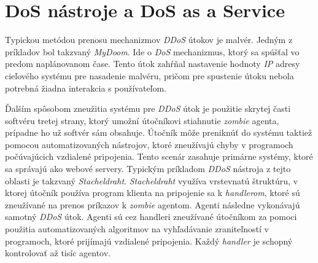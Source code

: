 \documentclass[
  printed, %
  table,   %
  lof,     %
  lot,     %
]{fithesis3}
\begin{document}

\section{DoS nástroje a DoS as a Service}
Typickou metódou prenosu mechanizmov \textit{DDoS} útokov je malvér. Jedným z príkladov bol
takzvaný \textit{MyDoom}. Ide o \textit{DoS} mechanizmus, ktorý sa spúšťal vo predom naplánovanom čase.
Tento útok zahŕňal nastavenie hodnoty \textit{IP} adresy cieľového systému pre nasadenie malvéru,
pričom pre spustenie útoku nebola potrebná žiadna interakcia s používateľom.

Ďalším spôsobom zneužitia systému pre \textit{DDoS} útok je použitie skrytej časti softvéru tretej
strany, ktorý umožní útočníkovi stiahnutie \textit{zombie} agenta, prípadne ho už softvér sám obsahuje.
Útočník môže preniknúť do systému taktiež pomocou automatizovaných nástrojov, ktoré zneužívajú chyby v
programoch počúvajúcich vzdialené pripojenia. Tento scenár zasahuje primárne systémy, ktoré sa správajú
ako webové servery. Typickým príkladom \textit{DDoS} nástroja z tejto oblasti je takzvaný
\textit{Stacheldraht}. \textit{Stacheldraht} využíva vrstevnatú štruktúru, v ktorej útočník používa
program klienta na pripojenie sa k \textit{handlerom}, ktoré sú zneužívané na prenos príkazov
k \textit{zombie} agentom. Agenti následne vykonávajú samotný \textit{DDoS} útok. Agenti sú cez handleri
zneužívané útočníkom za pomoci použitia automatizovaných algoritmov na vyhľadávanie zraniteľností v
programoch, ktoré prijímajú vzdialené pripojenia. Každý \textit{handler} je schopný kontrolovať až tisíc
agentov. 
\end{document}

